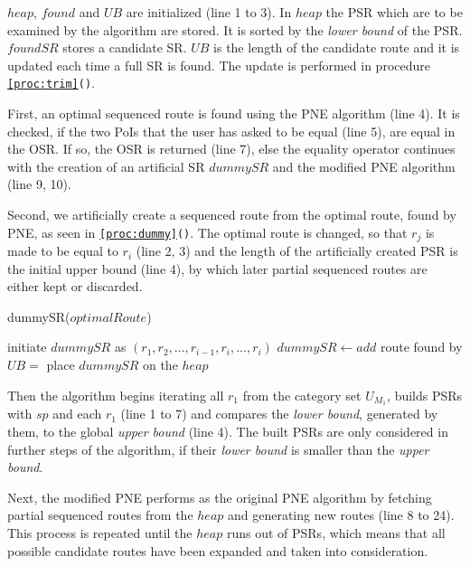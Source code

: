 \pagebreak

$heap$, $found$ and $UB$ are initialized (line 1 to 3). In $heap$ the PSR which are to be examined by the algorithm are stored. It is sorted by the \textit{lower bound} of the PSR. $foundSR$ stores a candidate SR. $UB$ is the length of the candidate route and it is updated each time a full SR is found. The update is performed in procedure \texttt{\ref{proc:trim}()}.

First, an optimal sequenced route is found using the PNE algorithm (line 4). It is checked, if the two PoIs that the user has asked to be equal (line 5), are equal in the OSR. If so, the OSR is returned (line 7), else the equality operator continues with the creation of an artificial SR $dummySR$ and the modified PNE algorithm (line 9, 10). 

Second, we artificially create a sequenced route from the optimal route, found by PNE, as seen in \texttt{\ref{proc:dummy}()}. The optimal route is changed, so that $r_j$ is made to be equal to $r_i$ (line 2, 3) and the length of the artificially created PSR is the initial upper bound (line 4), by which later partial sequenced routes are either kept or discarded.

\begin{procedure}[htb!]
\caption{dummySR($optimalRoute$)}
\label{proc:dummy}
	
	initiate $dummySR$ as $(r_1, r_2, ..., r_{i-1}, r_i, ..., r_i)$ 
	$dummySR \leftarrow add$ route found by \;
	$UB =$ \;
	place $dummySR$ on the $heap$\;
\end{procedure}

Then the algorithm \texttt{} begins iterating all $r_1$ from the category set $U_{M_1}$, builds PSRs with $sp$ and each $r_1$ (line 1 to 7) and compares the \textit{lower bound}, generated by them, to the global \textit{upper bound} (line 4). The built PSRs are only considered in further steps of the algorithm, if their \textit{lower bound} is smaller than the \textit{upper bound}.

Next, the modified PNE performs as the original PNE algorithm by fetching partial sequenced routes from the $heap$ and generating new routes (line 8 to 24). This process is repeated until the $heap$ runs out of PSRs, which means that all possible candidate routes have been expanded and taken into consideration.

